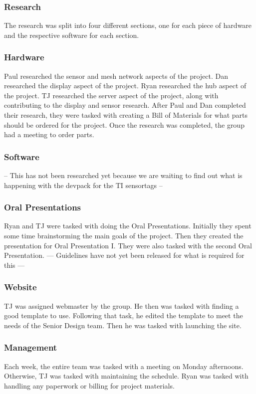 \documentclass[PPFS.tex]{template/subfiles}
\begin{document}
\subsubsection{Research}
The research was split into four different sections, one for each piece of hardware and the respective software for each section.

\subsubsection{Hardware}
Paul researched the sensor and mesh network aspects of the project. Dan researched the display aspect of the project. Ryan researched the hub aspect of the project. TJ researched the server aspect of the project, along with contributing to the display and sensor research. After Paul and Dan completed their research, they were tasked with creating a Bill of Materials for what parts should be ordered for the project. Once the research was completed, the group had a meeting to order parts.

\subsubsection{Software}
-- This has not been researched yet because we are waiting to find out what is happening with the devpack for the TI sensortags --

\subsubsection{Oral Presentations}
Ryan and TJ were tasked with doing the Oral Presentations. Initially they spent some time brainstorming the main goals of the project. Then they created the presentation for Oral Presentation I. They were also tasked with the second Oral Presentation. --- Guidelines have not yet been released for what is required for this ---

\subsubsection{Website}
TJ was assigned webmaster by the group. He then was tasked with finding a good template to use. Following that task, he edited the template to meet the needs of the Senior Design team. Then he was tasked with launching the site.

\subsubsection{Management}
Each week, the entire team was tasked with a meeting on Monday afternoons. Otherwise, TJ was tasked with maintaining the schedule. Ryan was tasked with handling any paperwork or billing for project materials.
\end{document}
